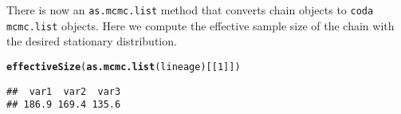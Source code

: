 \documentclass{article}\usepackage[]{graphicx}\usepackage[]{color}
\makeatletter
\newcommand{\hlnum}[1]{\textcolor[rgb]{0.686,0.059,0.569}{#1}}%
\newcommand{\hlstd}[1]{\textcolor[rgb]{0.345,0.345,0.345}{#1}}%
\newcommand{\hlkwd}[1]{\textcolor[rgb]{0.737,0.353,0.396}{\textbf{#1}}}%
\newenvironment{kframe}{%
 \def\at@end@of@kframe{}%
 \ifinner\ifhmode%
  \def\at@end@of@kframe{\end{minipage}}%
  \begin{minipage}{\columnwidth}%
 \fi\fi%
 \def\FrameCommand##1{\hskip\@totalleftmargin \hskip-\fboxsep
 \colorbox{shadecolor}{##1}\hskip-\fboxsep
     \hskip-\linewidth \hskip-\@totalleftmargin \hskip\columnwidth}%
 \MakeFramed {\advance\hsize-\width
   \@totalleftmargin\z@ \linewidth\hsize
   \@setminipage}}%
 {\par\unskip\endMakeFramed%
 \at@end@of@kframe}
\newenvironment{knitrout}{}{} %
\makeatother
\begin{document}
There is now an {\tt as.mcmc.list} method that converts chain objects
to {\tt coda mcmc.list} objects. Here we compute the effective sample
size of the chain with the desired stationary distribution.
\begin{knitrout}
\color{fgcolor}\begin{kframe}
\begin{alltt}
\hlkwd{effectiveSize}\hlstd{(}\hlkwd{as.mcmc.list}\hlstd{(lineage)[[}\hlnum{1}\hlstd{]])}
\end{alltt}
\begin{verbatim}
##  var1  var2  var3 
## 186.9 169.4 135.6
\end{verbatim}
\end{kframe}
\end{knitrout}
\end{document}
